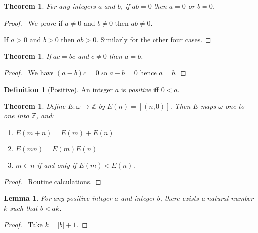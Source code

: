 \documentclass{report}
\let\qed\relax
\newtheorem{lemma}[axiom]{Lemma}
\newtheorem{theorem}[axiom]{Theorem}
\theoremstyle{definition}
\newtheorem{definition}[axiom]{Definition}
\begin{document}
    \begin{theorem}
        \label{theorem:integers_no_zero_divisors}
        For any integers $a$ and $b$, if $ab = 0$ then $a = 0$ or $b = 0$.
    \end{theorem}

    \begin{proof}
        \pf\ We prove if $a \neq 0$ and $b \neq 0$ then $ab \neq 0$.
        
        If $a > 0$ and $b > 0$ then $ab > 0$. Similarly for the other four cases. \qed
    \end{proof}

    \begin{theorem}
        \label{theorem:integers_cancel}
        If $ac = bc$ and $c \neq 0$ then $a = b$.
    \end{theorem}

    \begin{proof}
        \pf\ We have $(a-b)c = 0$ so $a-b = 0$ hence $a = b$. \qed
    \end{proof}

    \begin{definition}[Positive]
        An integer $a$ is \emph{positive} iff $0 < a$.
    \end{definition}

    \begin{theorem}
        Define $E : \omega \rightarrow \mathbb{Z}$ by $E(n) = [(n,0)]$. Then $E$ maps $\omega$ one-to-one
        into $\mathbb{Z}$, and:
        \begin{enumerate}
            \item $E(m+n) = E(m) + E(n)$
            \item $E(mn) = E(m) E(n)$
            \item $m \in n$ if and only if $E(m) < E(n)$.
        \end{enumerate}
    \end{theorem}

    \begin{proof}
        \pf\ Routine calculations. \qed
    \end{proof}

    \begin{lemma}
        \label{lemma:integers_Archimedean}
        For any positive integer $a$ and integer $b$, there exists a natural number $k$ such that
        $b < ak$.
    \end{lemma}

    \begin{proof}
        \pf\ Take $k = |b| + 1$. \qed
    \end{proof}
\end{document}
